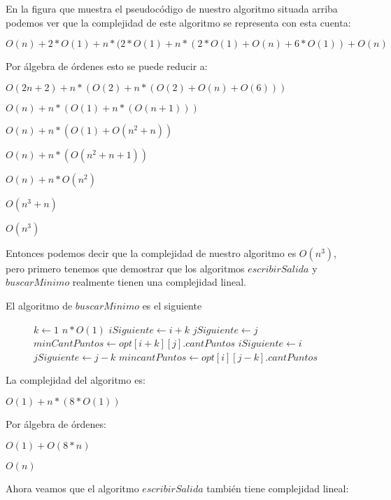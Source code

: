 En la figura que muestra el pseudocódigo de nuestro algoritmo situada arriba podemos ver que la complejidad de este algoritmo se representa con esta cuenta:

$O(n) + 2*O(1) + n*(2*O(1) + n*(2*O(1) +O(n) + 6*O(1)) + O(n)$

Por álgebra de órdenes esto se puede reducir a:

$O(2n+2) + n*(O(2) + n*(O(2) + O(n) + O (6)))$

$O(n) + n*(O(1) + n*(O(n+1)))$

$O(n) + n*(O(1) + O(n^2+n))$

$O(n) + n*(O(n^2 +n +1))$

$O(n) + n*O(n^2)$

$O(n^3+n)$

$O(n^3)$

Entonces podemos decir que la complejidad de nuestro algoritmo es $O(n^3)$, pero primero tenemos que demostrar que los algoritmos $escribirSalida$ y $buscarMinimo$ realmente tienen una complejidad lineal.

El algoritmo de $buscarMinimo$ es el siguiente

\begin{center}
 \begin{figure}[H]
  \begin{pseudo}
    \State $k \leftarrow 1$
     \hfill $n*O(1)$
	\State $iSiguiente \leftarrow i+k$
	\State $jSiguiente \leftarrow j$
	\State $minCantPuntos \leftarrow opt[i+k][j].cantPuntos$
      \EndIf
	\State $iSiguiente \leftarrow i$
	\State $jSiguiente \leftarrow j-k$
	\State $mincantPuntos \leftarrow opt[i][j-k].cantPuntos$
      \EndIf
    \EndWhile
   \EndProcedure
  \end{pseudo}

 \end{figure}

\end{center}

La complejidad del algoritmo es:

$O(1) + n*(8*O(1))$

Por álgebra de órdenes:

$O(1) + O(8*n)$

$O(n)$

Ahora veamos que el algoritmo $escribirSalida$ también tiene complejidad lineal:

